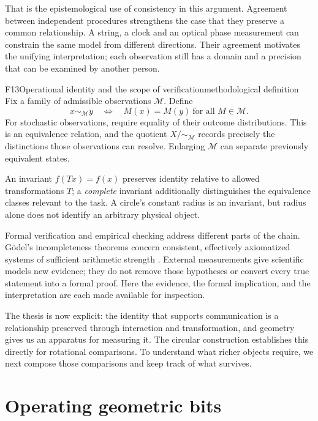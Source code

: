 \documentclass[11pt,a4paper]{article}
\begin{document}
That is the epistemological use of consistency in this argument. Agreement
between independent procedures strengthens the case that they preserve a
common relationship. A string, a clock and an optical phase measurement can
constrain the same model from different directions. Their agreement motivates
the unifying interpretation; each observation still has a domain and a
precision that can be examined by another person.

\begin{formal}{F13}{Operational identity and the scope of verification}{methodological definition}
Fix a family of admissible observations $\mathcal M$. Define
\begin{equation}\label{eq:operational-equivalence}
 x\sim_{\mathcal M}y\quad\Longleftrightarrow\quad
 M(x)=M(y)\ \text{for all }M\in\mathcal M.
\end{equation}
For stochastic observations, require equality of their outcome distributions.
This is an equivalence relation, and the quotient $X/{\sim_{\mathcal M}}$
records precisely the distinctions those observations can resolve. Enlarging
$\mathcal M$ can separate previously equivalent states.

An invariant $f(Tx)=f(x)$ preserves identity relative to allowed transformations
$T$; a \emph{complete} invariant additionally distinguishes the equivalence
classes relevant to the task. A circle's constant radius is an invariant,
but radius alone does not identify an arbitrary physical object.

Formal verification and empirical checking address different parts of the
chain. G\"odel's incompleteness theorems concern consistent, effectively
axiomatized systems of sufficient arithmetic strength \citep{Godel1931}.
External measurements give scientific models new evidence; they do not remove
those hypotheses or convert every true statement into a formal proof. Here
the evidence, the formal implication, and the interpretation are each made
available for inspection.
\end{formal}

The thesis is now explicit: the identity that supports communication is a
relationship preserved through interaction and transformation, and geometry
gives us an apparatus for measuring it. The circular construction establishes
this directly for rotational comparisons. To understand what richer objects
require, we next compose those comparisons and keep track of what survives.

\section{Operating geometric bits}
\label{sec:operations}
\end{document}
